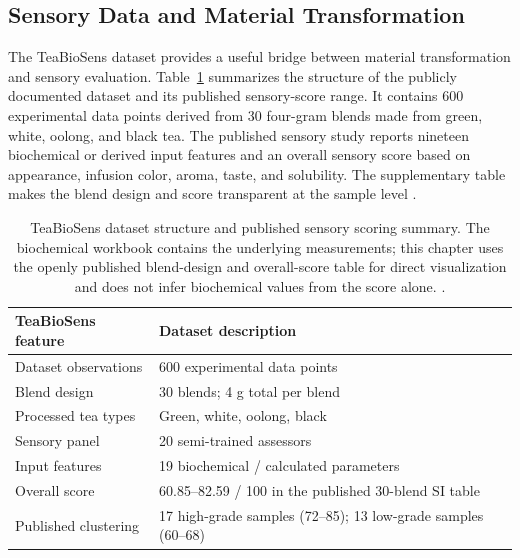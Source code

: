 \documentclass[numbers]{IntechOpen-Book}
\begin{document}
\subsection{Sensory Data and Material Transformation}

The TeaBioSens dataset provides a useful bridge between material transformation and sensory evaluation. Table~\ref{tab:teabiosens-summary} summarizes the structure of the publicly documented dataset and its published sensory-score range. It contains 600 experimental data points derived from 30 four-gram blends made from green, white, oolong, and black tea. The published sensory study reports nineteen biochemical or derived input features and an overall sensory score based on appearance, infusion color, aroma, taste, and solubility. The supplementary table makes the blend design and score transparent at the sample level \cite{teabiosensdata,sarmateabiosens}.

\begin{figure}[!b]
\centering
{}
\label{fig:teabiosens}
\end{figure}

\begin{table}[t]
\centering
\small
\renewcommand{\arraystretch}{1.10}
\begin{tabularx}{\textwidth}{>{\raggedright\arraybackslash}p{37mm} X}
\toprule
\textbf{TeaBioSens feature} & \textbf{Dataset description}\\
\midrule
Dataset observations & 600 experimental data points\\
Blend design & 30 blends; 4 g total per blend\\
Processed tea types & Green, white, oolong, black\\
Sensory panel & 20 semi-trained assessors\\
Input features & 19 biochemical / calculated parameters\\
Overall score & 60.85--82.59 / 100 in the published 30-blend SI table\\
Published clustering & 17 high-grade samples (72--85); 13 low-grade samples (60--68)\\
\bottomrule
\end{tabularx}
\caption{TeaBioSens dataset structure and published sensory scoring summary. The biochemical workbook contains the underlying measurements; this chapter uses the openly published blend-design and overall-score table for direct visualization and does not infer biochemical values from the score alone. \cite{teabiosensdata,sarmateabiosens}.}
\label{tab:teabiosens-summary}
\end{table}
\end{document}
